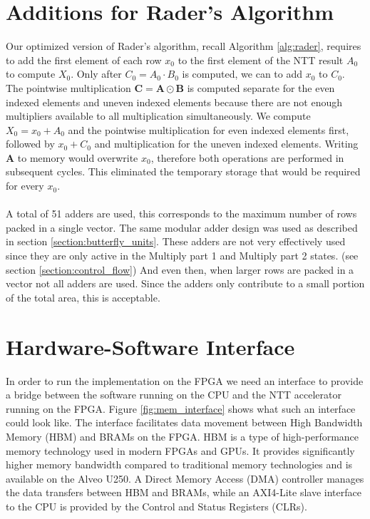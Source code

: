 \documentclass[english,master=eelt,masteroption=ec]{kulemt}
\begin{document}
\section{Additions for Rader's Algorithm}
Our optimized version of Rader's algorithm, recall Algorithm \ref{alg:rader}, requires to add the first element of each row $x_0$ to the first element of the NTT result $A_0$ to compute $X_0$. Only after $C_0 = A_0 \cdot B_0$ is computed, we can to add $x_0$ to $C_0$. The pointwise multiplication $\mathbf{C} = \mathbf{A} \odot \mathbf{B}$ is computed separate for the even indexed elements and uneven indexed elements because there are not enough multipliers available to all multiplication simultaneously. We compute $X_0 = x_0 + A_0$ and the pointwise multiplication for even indexed elements first, followed by $x_0 + C_0$ and multiplication for the uneven indexed elements. Writing $\mathbf{A}$ to memory would overwrite $x_0$, therefore both operations are performed in subsequent cycles. This eliminated the temporary storage that would be required for every $x_0$.
\\\\
A total of 51 adders are used, this corresponds to the maximum number of rows packed in a single vector. The same modular adder design was used as described in section \ref{section:butterfly_units}. These adders are not very effectively used since they are only active in the Multiply part 1 and Multiply part 2 states. (see section \ref{section:control_flow}) And even then, when larger rows are packed in a vector not all adders are used. Since the adders only contribute to a small portion of the total area, this is acceptable.


\section{Hardware-Software Interface}
In order to run the implementation on the FPGA we need an interface to provide a bridge between the software running on the CPU and the NTT accelerator running on the FPGA. Figure \ref{fig:mem_interface} shows what such an interface could look like. The interface facilitates data movement between High Bandwidth Memory (HBM) and BRAMs on the FPGA. HBM is a type of high-performance memory technology used in modern FPGAs and GPUs. It provides significantly higher memory bandwidth compared to traditional memory technologies and is available on the Alveo U250. A Direct Memory Access (DMA) controller manages the data transfers between HBM and BRAMs, while an AXI4-Lite slave interface to the CPU is provided by the Control and Status Registers (CLRs).
\end{document}
